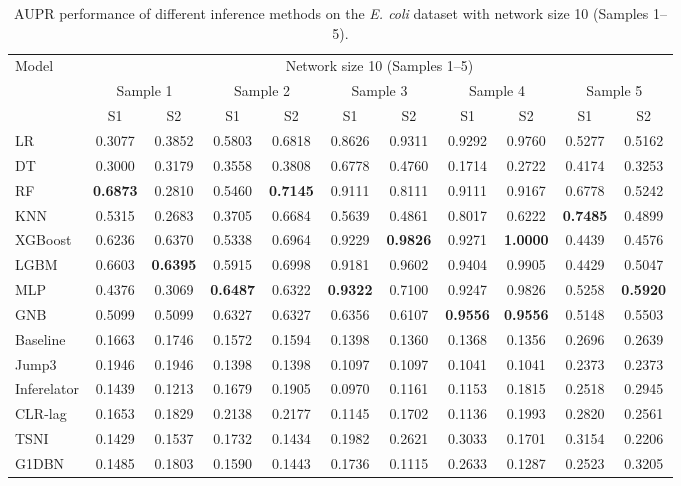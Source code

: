 \begin{table}[!h]
\centering
\caption{AUPR performance of different inference methods on the \textit{E. coli} dataset with network size 10 (Samples 1--5).}
\label{tab:size10_part1}
{\renewcommand{\arraystretch}{0.6}
\setlength{\tabcolsep}{2pt}
\begin{tabular}{lcccccccccc}
\toprule
Model
& \multicolumn{10}{c}{Network size 10 (Samples 1--5)} \\
\cmidrule(lr){2-11}
& \multicolumn{2}{c}{Sample 1}
& \multicolumn{2}{c}{Sample 2}
& \multicolumn{2}{c}{Sample 3}
& \multicolumn{2}{c}{Sample 4}
& \multicolumn{2}{c}{Sample 5} \\
\cmidrule(lr){2-3}\cmidrule(lr){4-5}\cmidrule(lr){6-7}
\cmidrule(lr){8-9}\cmidrule(lr){10-11}
& S1 & S2 & S1 & S2 & S1 & S2 & S1 & S2 & S1 & S2 \\
\midrule
LR
& 0.3077 & 0.3852 & 0.5803 & 0.6818 & 0.8626 & 0.9311
& 0.9292 & 0.9760 & 0.5277 & 0.5162 \\
DT
& 0.3000 & 0.3179 & 0.3558 & 0.3808 & 0.6778 & 0.4760
& 0.1714 & 0.2722 & 0.4174 & 0.3253 \\
RF
& \textbf{0.6873} & 0.2810 & 0.5460 & \textbf{0.7145} & 0.9111 & 0.8111
& 0.9111 & 0.9167 & 0.6778 & 0.5242 \\
KNN
& 0.5315 & 0.2683 & 0.3705 & 0.6684 & 0.5639 & 0.4861
& 0.8017 & 0.6222 & \textbf{0.7485} & 0.4899 \\
XGBoost
& 0.6236 & 0.6370 & 0.5338 & 0.6964 & 0.9229 & \textbf{0.9826}
& 0.9271 & \textbf{1.0000} & 0.4439 & 0.4576 \\
LGBM
& 0.6603 & \textbf{0.6395} & 0.5915 & 0.6998 & 0.9181 & 0.9602
& 0.9404 & 0.9905 & 0.4429 & 0.5047 \\
MLP
& 0.4376 & 0.3069 & \textbf{0.6487} & 0.6322 & \textbf{0.9322} & 0.7100
& 0.9247 & 0.9826 & 0.5258 & \textbf{0.5920} \\
GNB
& 0.5099 & 0.5099 & 0.6327 & 0.6327 & 0.6356 & 0.6107
& \textbf{0.9556} & \textbf{0.9556} & 0.5148 & 0.5503 \\
\midrule
Baseline
& 0.1663 & 0.1746 & 0.1572 & 0.1594 & 0.1398 & 0.1360
& 0.1368 & 0.1356 & 0.2696 & 0.2639 \\
Jump3
& 0.1946 & 0.1946 & 0.1398 & 0.1398 & 0.1097 & 0.1097
& 0.1041 & 0.1041 & 0.2373 & 0.2373 \\
Inferelator
& 0.1439 & 0.1213 & 0.1679 & 0.1905 & 0.0970 & 0.1161
& 0.1153 & 0.1815 & 0.2518 & 0.2945 \\
CLR-lag
& 0.1653 & 0.1829 & 0.2138 & 0.2177 & 0.1145 & 0.1702
& 0.1136 & 0.1993 & 0.2820 & 0.2561 \\
TSNI
& 0.1429 & 0.1537 & 0.1732 & 0.1434 & 0.1982 & 0.2621
& 0.3033 & 0.1701 & 0.3154 & 0.2206 \\
G1DBN
& 0.1485 & 0.1803 & 0.1590 & 0.1443 & 0.1736 & 0.1115
& 0.2633 & 0.1287 & 0.2523 & 0.3205 \\
\bottomrule
\end{tabular}
}
\end{table}



